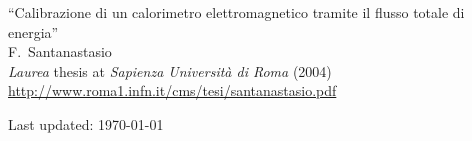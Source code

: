\documentclass[10pt, a4paper]{article}
\begin{document}
\begin{thebibliography}{599}
``Calibrazione di un calorimetro elettromagnetico tramite il flusso totale di energia''
  \\{}F.~Santanastasio
  \\{}\textit{Laurea} thesis at \textit{Sapienza Universit\`a di Roma} (2004)
  \\{}\href{http://www.roma1.infn.it/cms/tesi/santanastasio.pdf}{http://www.roma1.infn.it/cms/tesi/santanastasio.pdf}


\end{thebibliography}

\vfill{}
\hrulefill

\begin{center}
{\footnotesize Last updated: \today}
\end{center}
\end{document}

